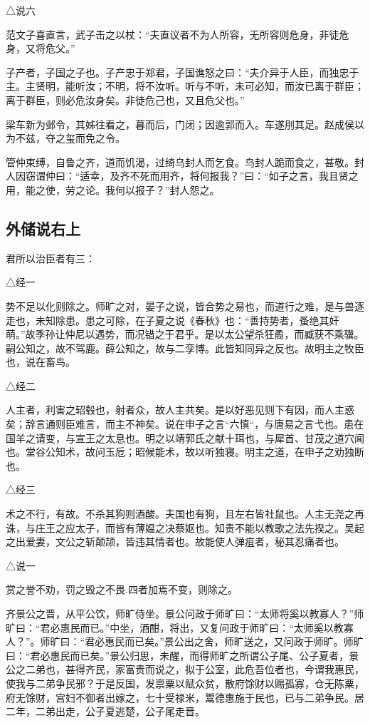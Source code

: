 \documentclass[]{article}
\begin{document}
△说六

范文子喜直言，武子击之以杖：``夫直议者不为人所容，无所容则危身，非徒危身，又将危父。''

子产者，子国之子也。子产忠于郑君，子国谯怒之曰：``夫介异于人臣，而独忠于主。主贤明，能听汝；不明，将不汝听。听与不听，未可必知，而汝已离于群臣；离于群臣，则必危汝身矣。非徒危己也，又且危父也。''

梁车新为邺令，其姊往看之，暮而后，门闭；因逾郭而入。车遂刖其足。赵成侯以为不兹，夺之玺而免之令。

管仲束缚，自鲁之齐，道而饥渴，过绮乌封人而乞食。鸟封人跪而食之，甚敬。封人因窃谓仲曰：``适幸，及齐不死而用齐，将何报我？''曰：``如子之言，我且贤之用，能之使，劳之论。我何以报子？''封人怨之。

\hypertarget{header-n1391}{%
\subsection{外储说右上}\label{header-n1391}}

君所以治臣者有三：

△经一

势不足以化则除之。师旷之对，晏子之说，皆合势之易也，而道行之难，是与兽逐走也，未知除患。患之可除，在子夏之说《春秋》也：``善持势者，蚤绝其奸萌。''故季孙让仲尼以遇势，而况错之于君乎。是以太公望杀狂矞，而臧获不乘骥。嗣公知之，故不驾鹿。薛公知之，故与二孪博。此皆知同异之反也。故明主之牧臣也，说在畜鸟。

△经二

人主者，利害之轺毂也，射者众，故人主共矣。是以好恶见则下有因，而人主惑矣；辞言通则臣难言，而主不神矣。说在申子之言``六慎``，与唐易之言弋也。患在国羊之请变，与宣王之太息也。明之以靖郭氏之献十珥也，与犀首、甘茂之道穴闻也。堂谷公知术，故问玉卮；昭候能术，故以听独寝。明主之道，在申子之劝独断也。

△经三

术之不行，有故。不杀其狗则酒酸。夫国也有狗，且左右皆社鼠也。人主无尧之再诛，与庄王之应太子，而皆有薄媪之决蔡妪也。知贵不能以教歌之法先揆之。吴起之出爱妻，文公之斩颠颉，皆违其情者也。故能使人弹疽者，秘其忍痛者也。

△说一

赏之誉不劝，罚之毁之不畏.四者加焉不变，则除之。

齐景公之晋，从平公饮，师旷侍坐。景公问政于师旷曰：``太师将奚以教寡人？''师旷曰：``君必惠民而已。''中坐，酒酣，将出，又复问政于师旷曰：``太师奚以教寡人？''。师旷曰：``君必惠民而已矣。''景公出之舍，师旷送之，又问政于师旷。师旷曰：``君必惠民而已矣。''景公归思，未醒，而得师旷之所谓公子尾、公子夏者，景公之二弟也，甚得齐民，家富贵而说之，拟于公室，此危吾位者也，今谓我惠民，使我与二弟争民邪？于是反国，发禀粟以赋众贫，散府馀财以赐孤寡，仓无陈粟，府无馀财，宫妇不御者出嫁之，七十受禄米，鬻德惠施于民也，已与二弟争民。居二年，二弟出走，公子夏逃楚，公子尾走晋。
\end{document}
